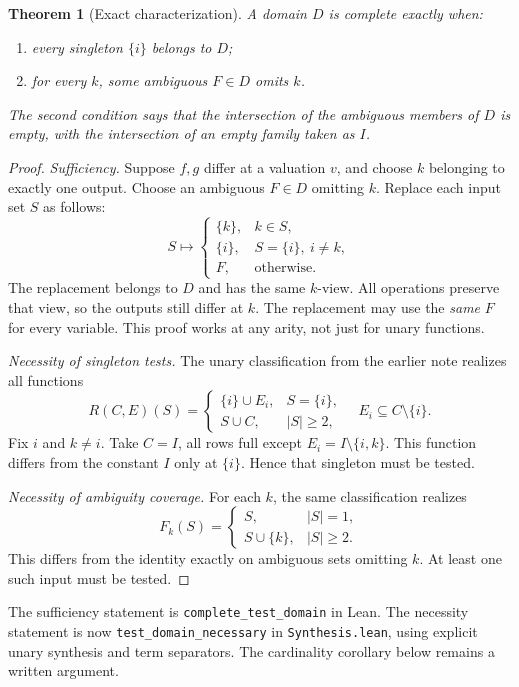 \documentclass[11pt]{article}
\newtheorem{theorem}{Theorem}[section]
\begin{document}
\begin{theorem}[Exact characterization]\label{thm:tests}
A domain $D$ is complete exactly when:
\begin{enumerate}
\item every singleton $\{i\}$ belongs to $D$;
\item for every $k$, some ambiguous $F\in D$ omits $k$.
\end{enumerate}
The second condition says that the intersection of the ambiguous members
of $D$ is empty, with the intersection of an empty family taken as $I$.
\end{theorem}
\begin{proof}
\emph{Sufficiency.} Suppose $f,g$ differ at a valuation $v$, and choose
$k$ belonging to exactly one output. Choose an ambiguous $F\in D$
omitting $k$. Replace each input set $S$ as follows:
\[
 S\longmapsto
 \begin{cases}
 \{k\},&k\in S,\\
 \{i\},&S=\{i\},\ i\ne k,\\
 F,&\text{otherwise}.
 \end{cases}
\]
The replacement belongs to $D$ and has the same $k$-view. All operations
preserve that view, so the outputs still differ at $k$. The replacement
may use the \emph{same} $F$ for every variable. This proof works at any
arity, not just for unary functions.

\emph{Necessity of singleton tests.} The unary classification from the
earlier note realizes all functions
\[
 R(C,E)(S)=\begin{cases}\{i\}\cup E_i,&S=\{i\},\\
 S\cup C,&|S|\geq2,\end{cases}
 \quad E_i\subseteq C\setminus\{i\}.
\]
Fix $i$ and $k\ne i$. Take $C=I$, all rows full except
$E_i=I\setminus\{i,k\}$. This function differs from the constant $I$
only at $\{i\}$. Hence that singleton must be tested.

\emph{Necessity of ambiguity coverage.} For each $k$, the same
classification realizes
\[
 F_k(S)=\begin{cases}S,&|S|=1,\\S\cup\{k\},&|S|\geq2.\end{cases}
\]
This differs from the identity exactly on ambiguous sets omitting $k$.
At least one such input must be tested.
\end{proof}

The sufficiency statement is \texttt{complete\_test\_domain} in Lean.
The necessity statement is now \texttt{test\_domain\_necessary} in
\texttt{Synthesis.lean}, using explicit unary synthesis and term
separators. The cardinality corollary below remains a written argument.
\end{document}
